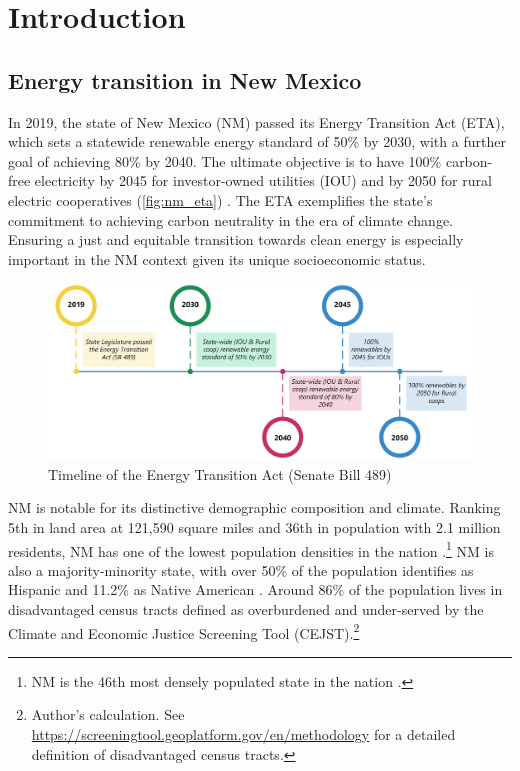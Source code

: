 \documentclass[12pt,twoside,letterpaper]{article}
\begin{document}
\newpage



\tableofcontents
\listoffigures
\listoftables
\newpage

\section{Introduction}

\subsection{Energy transition in New Mexico}


In 2019, the state of New Mexico (NM) passed its Energy Transition Act (ETA), which sets a statewide renewable energy standard of 50\% by 2030, with a further goal of achieving 80\% by 2040. The ultimate objective is to have 100\% carbon-free electricity by 2045 for investor-owned utilities (IOU) and by 2050 for rural electric cooperatives (\autoref{fig:nm_eta}) \parencite{nmleg2019}. The ETA exemplifies the state's commitment to achieving carbon neutrality in the era of climate change. Ensuring a just and equitable transition towards clean energy is especially important in the NM context given its unique socioeconomic status.

\begin{figure}[!ht]
    \centering
    \includegraphics[width=1\textwidth]{figures/nm_eta.png}
    \caption{Timeline of the Energy Transition Act (Senate Bill 489)}
    \label{fig:nm_eta}
\end{figure}

NM is notable for its distinctive demographic composition and climate. Ranking 5th in land area at 121,590 square miles and 36th in population with 2.1 million residents, NM has one of the lowest population densities in the nation \parencite{uscensus2022}.\footnote{NM is the 46th most densely populated state in the nation \parencite{uscensus2022}.} NM is also a majority-minority state, with over 50\% of the population identifies as Hispanic and 11.2\% as Native American \parencite{uscensus2020}.  Around 86\% of the population lives in disadvantaged census tracts defined as overburdened and under-served by the Climate and Economic Justice Screening Tool (CEJST).\footnote{Author's calculation. See \url{https://screeningtool.geoplatform.gov/en/methodology} for a detailed definition of disadvantaged census tracts.} 
\end{document}
